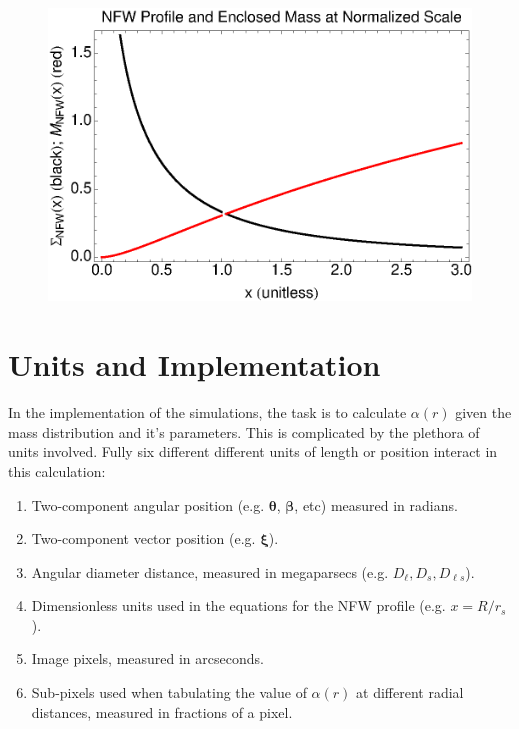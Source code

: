 \documentclass[10pt,twoside]{article}
\theoremstyle{definition}
\theoremstyle{exercise}
\renewcommand{\v}[1]{\boldsymbol{#1}}%
\begin{document}
\begin{figure}[h]
\center
\includegraphics{../images/NFW_Profile.eps}
\end{figure}


\section{Units and Implementation}

\label{sec:units}
In the implementation of the simulations, the task is to calculate $\alpha(r)$ given the mass distribution and it's parameters. This is complicated by the plethora of units involved. Fully six different different units of length or position interact in this calculation:
\begin{enumerate}
		\item Two-component angular position (e.g. $\v{\theta}$, $\v{\beta}$, etc) measured in radians.
		\item Two-component vector position (e.g. $\v{\xi}$).
		\item Angular diameter distance, measured in megaparsecs (e.g. $D_\ell, D_s, D_{\ell s}$).
		\item Dimensionless units used in the equations for the NFW profile (e.g. $x = R/r_s$).
		\item Image pixels, measured in arcseconds.
		\item Sub-pixels used when tabulating the value of $\alpha(r)$ at different radial distances, measured in fractions of a pixel.
\end{enumerate}
\end{document}
